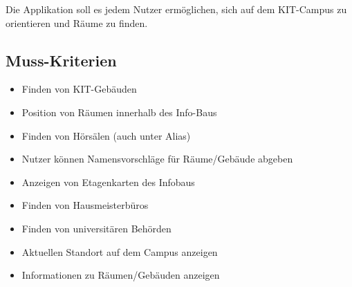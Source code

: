 Die Applikation soll es jedem Nutzer ermöglichen,
sich auf dem KIT-Campus zu orientieren und Räume zu finden.

\subsection{Muss-Kriterien}

\begin{itemize}

    \item Finden von KIT-Gebäuden
    \item Position von Räumen innerhalb des Info-Baus
    \item Finden von Hörsälen (auch unter Alias)
    \item Nutzer können Namensvorschläge für Räume/Gebäude abgeben
    \item Anzeigen von Etagenkarten des Infobaus
    \item Finden von Hausmeisterbüros
    \item Finden von universitären Behörden
    \item Aktuellen Standort auf dem Campus anzeigen
    \item Informationen zu Räumen/Gebäuden anzeigen


\end{itemize}
